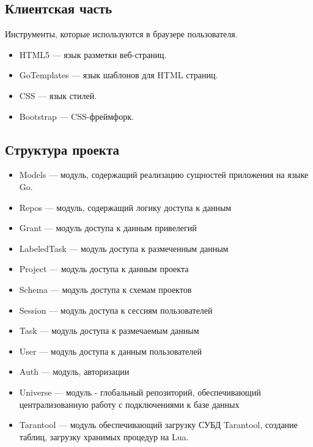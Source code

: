 \subsection{Клиентская часть}

\begin{frame}
Инструменты, которые используются в браузере пользователя.
\begin{itemize}
    \item HTML5 --- язык разметки веб-страниц.
    
    \item GoTemplates --- язык шаблонов для HTML страниц. 
    \item CSS --- язык стилей.

    \item Bootstrap --- CSS-фреймфорк.
\end{itemize}
\end{frame}

\subsection{Структура проекта}


\begin{frame}
    \begin{itemize}
        \item Models --- модуль, содержащий реализацию сущностей приложения на языке Go.
        \item Repos --- модуль, содержащий логику доступа к данным
            \item Grant --- модуль доступа к данным привелегий
            \item LabeledTask --- модуль доступа к размеченным данным
            \item Project --- модуль доступа к данным проекта
            \item Schema --- модуль доступа к схемам проектов
            \item Session --- модуль доступа к сессиям пользователей
            \item Task --- модуль доступа к размечаемым данным
            \item User --- модуль доступа к данным пользователей
           \end{itemize}
\end{frame}

\begin{frame}
    \begin{itemize}
        \item Auth ---   модуль, авторизации
        \item Universe --- модуль - глобальный репозиторий, обеспечивающий централизованную работу с подключениями к базе данных
        \item Tarantool --- модуль обеспечивающий загрузку СУБД Tarantool, создание таблиц, загрузку хранимых процедур на Lua.

    \end{itemize}
\end{frame}
